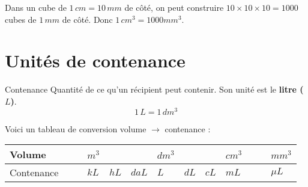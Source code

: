 \documentclass[a4paper,dvipsnames]{article}
\begin{document}
\begin{Pp}
Dans un cube de $1\,cm=10\,mm$ de côté, on peut construire $10\times10\times10=1000$ cubes de $1\, mm$ de côté.
Donc $1 \,cm^3 = 1000 mm^3$.

\begin{center}

\end{center}
\end{Pp}

\section{Unités de contenance}

\begin{DefT}{Contenance}
Quantité de ce qu'un récipient peut contenir. Son unité est le \textbf{litre ($L$)}.
\[1\,L=1\,dm^3\]
\end{DefT}

\begin{Mt}
Voici un tableau de conversion volume $\rightarrow$ contenance :
\begin{center}
\begin{tabular}{M{1.8cm}||M{.6cm}|M{.6cm}|M{.6cm}||M{.6cm}|M{.6cm}|M{.6cm}||M{.6cm}|M{.6cm}|M{.6cm}||M{.6cm}|M{.6cm}|M{.6cm}}
Volume & & & $m^3$ & & & $dm^3$ & & & $cm^3$ & & & $mm^3$\\\hline
Contenance & & & $kL$ & $hL$ & $daL$ & $L$ & $dL$ & $cL$ & $mL$ & & & $\mu L$ \\
\end{tabular}
\end{center}
\end{Mt}
\end{document}
